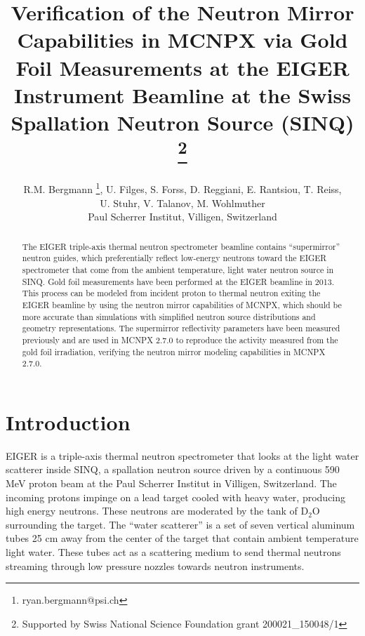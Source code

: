 \documentclass[a4paper,
              ]{jacow}
\begin{document}
\title{Verification of the Neutron Mirror Capabilities in MCNPX via Gold Foil Measurements at the EIGER Instrument Beamline at the Swiss Spallation Neutron Source (SINQ) \thanks{Supported by Swiss National Science Foundation grant 200021\_150048/1} }

\author{R.M. Bergmann \thanks{ryan.bergmann@psi.ch}, U. Filges, S. Forss, D. Reggiani, E. Rantsiou, T. Reiss, \\ U. Stuhr, V. Talanov, M. Wohlmuther \\ Paul Scherrer Institut, Villigen, Switzerland}

\maketitle

%
\begin{abstract}
   The EIGER triple-axis thermal neutron spectrometer beamline contains “supermirror” neutron guides, which preferentially reflect low-energy neutrons toward the EIGER spectrometer that come from the ambient temperature, light water neutron source in SINQ.  Gold foil measurements have been performed at the EIGER beamline in 2013.  This process can be modeled from incident proton to thermal neutron exiting the EIGER beamline by using the neutron mirror capabilities of MCNPX, which should be more accurate than simulations with simplified neutron source distributions and geometry representations.  The supermirror reflectivity parameters have been measured previously and are used in MCNPX 2.7.0 to reproduce the activity measured from the gold foil irradiation, verifying the neutron mirror modeling capabilities in MCNPX 2.7.0.
\end{abstract}


\section{Introduction}

EIGER is a triple-axis thermal neutron spectrometer that looks at the light water scatterer inside SINQ, a spallation neutron source driven by a continuous 590 MeV proton beam at the Paul Scherrer Institut in Villigen, Switzerland.  The incoming protons impinge on a lead target cooled with heavy water, producing high energy neutrons.  These neutrons are moderated by the tank of D$_2$O surrounding the target.  The ``water scatterer'' is a set of seven vertical aluminum tubes 25 cm away from the center of the target that contain ambient temperature light water.  These tubes act as a scattering medium to send thermal neutrons streaming through low pressure nozzles towards neutron instruments.  
\end{document}
